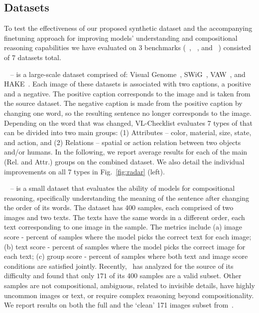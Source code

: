 \subsection{Datasets}\label{sec:datasets}
To test the effectiveness of our proposed \ourdataset{} synthetic dataset and the accompanying finetuning approach for improving \vl{} models' \vlc{} understanding and compositional reasoning capabilities we have evaluated on 3 benchmarks (\winoground{}~\cite{winoground}, \vlchecklist{}~\cite{vlc}, and \ARO{}~\cite{aro}) consisted of 7 datasets total.

\noindent\textbf{\vlchecklist{}~\cite{vlc}} -- is a large-scale dataset comprised of: Visual Genome~\cite{vg}, SWiG~\cite{swig}, VAW~\cite{vaw}, and HAKE~\cite{hake}. Each image of these datasets is associated with two captions, a positive and a negative. The positive caption corresponds to the image and is taken from the source dataset. The negative caption is made from the positive caption by changing one word, so the resulting sentence no longer corresponds to the image. Depending on the word that was changed, VL-Checklist evaluates 7 types of \vlc{} that can be divided into two main groups: (1) Attributes -- color, material, size, state, and action, and (2) Relations -- spatial or action relation between two objects and/or humans. In the following, we report average results for each of the main (Rel. and Attr.) groups on the combined \vlchecklist{} dataset. We also detail the individual improvements on all 7 \vlc{} types in Fig.~\ref{fig:radar} (left).

\noindent\textbf{\winoground{}~\cite{winoground}} -- is a small dataset that evaluates the ability of \vl{} models for compositional reasoning, specifically understanding the meaning of the sentence after changing the order of its words. The dataset has 400 samples, each comprised of two images and two texts. The texts have the same words in a different order, each text corresponding to one image in the sample. The \winoground{} metrics include (a) image score - percent of samples where the model picks the correct text for each image; (b) text score - percent of samples where the model picks the correct image for each text; (c) group score - percent of samples where both text and image score conditions are satisfied jointly. Recently,~\cite{why_is_winoground_hard} has analyzed \winoground{} for the source of its difficulty and found that only $171$ of its 400 samples are a valid subset. Other samples are not compositional, ambiguous, related to invisible details, have highly uncommon images or text, or require complex reasoning beyond compositionality. We report results on both the full \winoground{} and the `clean' 171 images subset from~\cite{why_is_winoground_hard}.

